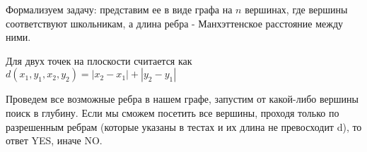 \solutionSection

Формализуем задачу: представим ее в виде графа на $n$ вершинах, где вершины соответствуют школьникам, а длина ребра - Манхэттенское расстояние между ними.

Для двух точек на плоскости считается как $d(x_1, y_1, x_2, y_2) = |x_2 - x_1| + |y_2 - y_1|$

Проведем все возможные ребра в нашем графе, запустим от какой-либо вершины поиск в глубину. Если мы сможем посетить все вершины, проходя только по разрешенным ребрам (которые указаны в тестах и их длина не превосходит d), то ответ YES, иначе NO.

\codeExample

